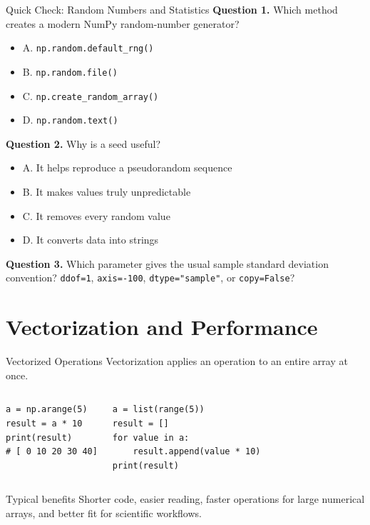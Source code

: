 \documentclass[aspectratio=169,11pt]{beamer}
\newcommand{\quiztitle}[1]{\textbf{\textcolor{QuizOrange}{#1}}}
\begin{document}
\begin{frame}{Quick Check: Random Numbers and Statistics}
\small
\quiztitle{Question 1.} Which method creates a modern NumPy random-number generator?
\begin{itemize}
  \item A. \texttt{np.random.default\_rng()}
  \item B. \texttt{np.random.file()}
  \item C. \texttt{np.create\_random\_array()}
  \item D. \texttt{np.random.text()}
\end{itemize}
\quiztitle{Question 2.} Why is a seed useful?
\begin{itemize}
  \item A. It helps reproduce a pseudorandom sequence
  \item B. It makes values truly unpredictable
  \item C. It removes every random value
  \item D. It converts data into strings
\end{itemize}
\quiztitle{Question 3.} Which parameter gives the usual sample standard deviation convention? \texttt{ddof=1}, \texttt{axis=-100}, \texttt{dtype="sample"}, or \texttt{copy=False}?
\end{frame}

\section{Vectorization and Performance}

\begin{frame}[fragile]{Vectorized Operations}
\small
Vectorization applies an operation to an entire array at once.
\begin{columns}[T]
\begin{lstlisting}[style=py]
a = np.arange(5)
result = a * 10
print(result)
# [ 0 10 20 30 40]
\end{lstlisting}
\begin{lstlisting}[style=py]
a = list(range(5))
result = []
for value in a:
    result.append(value * 10)
print(result)
\end{lstlisting}
\end{columns}
\begin{block}{Typical benefits}
Shorter code, easier reading, faster operations for large numerical arrays, and better fit for scientific workflows.
\end{block}
\end{frame}
\end{document}
